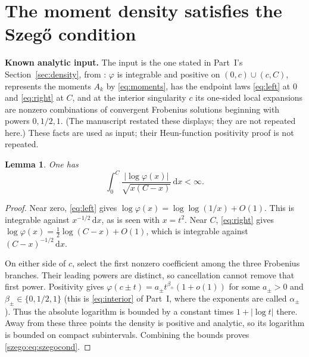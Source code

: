 \documentclass[11pt,a4paper]{article}
\numberwithin{equation}{section}
\newtheorem{lemma}[theorem]{Lemma}
\theoremstyle{remark}\newtheorem{remark}[theorem]{Remark}
\newcommand{\dd}{\,\mathrm d}
\newcommand{\abs}[1]{\lvert#1\rvert}
\begin{document}
\section{The moment density satisfies the Szeg\H{o} condition}
\label{szego:sec:density}
\textbf{Known analytic input.}
The input is the one stated in Part~I's Section~\ref{sec:density}, from
\cite[Theorem 1, Proposition 4, Propositions 25--26, Corollary 27]{edgar}:
$\varphi$ is integrable and positive on $(0,c)\cup(c,C)$, represents the
moments $A_k$ by \eqref{eq:moments}, has the endpoint laws \eqref{eq:left} at
$0$ and \eqref{eq:right} at $C$, and at the interior singularity $c$ its
one-sided local expansions are nonzero combinations of convergent Frobenius
solutions beginning with powers $0,1/2,1$. (The manuscript restated these
displays; they are not repeated here.)
These facts are used as input; their Heun-function positivity proof is not
repeated.

\begin{lemma}\label{szego:lem:szegocond}
One has
\begin{equation}\label{szego:eq:szegocond}
 \int_0^C\frac{\abs{\log\varphi(x)}}{\sqrt{x(C-x)}}\dd x<\infty.
\end{equation}
\end{lemma}
\begin{proof}
Near zero, \eqref{eq:left} gives
$\log\varphi(x)=\log\log(1/x)+O(1)$. This is integrable against $x^{-1/2}\dd x$,
as is seen with $x=t^2$.
Near $C$, \eqref{eq:right} gives
$\log\varphi(x)=\tfrac12\log(C-x)+O(1)$, which is integrable against
$(C-x)^{-1/2}\dd x$.

On either side of $c$, select the first nonzero coefficient among the three
Frobenius branches. Their leading powers are distinct, so cancellation
cannot remove that first power. Positivity gives
$\varphi(c\pm t)=a_\pm t^{\beta_\pm}(1+o(1))$ for some $a_\pm>0$ and
$\beta_\pm\in\{0,1/2,1\}$ (this is \eqref{eq:interior} of Part~I, where the
exponents are called $\alpha_\pm$). Thus the absolute logarithm is bounded by
a constant times $1+\abs{\log t}$ there.
Away from these three points the density is positive and analytic, so its
logarithm is bounded on compact subintervals. Combining the bounds proves
\eqref{szego:eq:szegocond}.
\end{proof}
\end{document}
